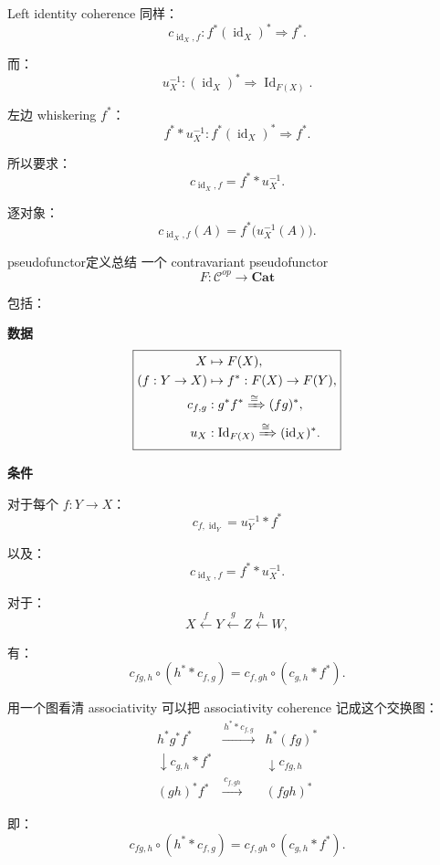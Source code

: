 \documentclass{beamer}
\begin{document}
\begin{frame}{Left identity coherence}
同样：
$$
c_{\operatorname{id}_X,f}
:
f^*(\operatorname{id}_X)^*
\Longrightarrow
f^*.
$$

而：
$$
u_X^{-1}:
(\operatorname{id}_X)^*
\Longrightarrow
\operatorname{Id}_{F(X)}.
$$

左边 whiskering \(f^*\)：
$$
f^**u_X^{-1}
:
f^*(\operatorname{id}_X)^*
\Longrightarrow
f^*.
$$

所以要求：
$$
\boxed{
c_{\operatorname{id}_X,f}
=
f^**u_X^{-1}.
}
$$

逐对象：
$$
\boxed{
c_{\operatorname{id}_X,f}(A)
=
f^*\bigl(u_X^{-1}(A)\bigr).
}
$$
\end{frame}

\begin{frame}{pseudofunctor定义总结}
一个 contravariant pseudofunctor
$$
\boxed{
F:\mathcal C^{op}\to\mathbf{Cat}
}
$$

包括：

\textbf{数据}
$$
\boxed{
\begin{aligned}
X&\mapsto F(X),\\
(f:Y\to X)&\mapsto f^*:F(X)\to F(Y),\\
c_{f,g}&:g^*f^*\xRightarrow{\cong}(fg)^*,\\
u_X&:\operatorname{Id}_{F(X)}
\xRightarrow{\cong}
(\operatorname{id}_X)^*.
\end{aligned}
}
$$

\textbf{条件}

对于每个 \(f:Y\to X\)：
$$
\boxed{
c_{f,\operatorname{id}_Y}
=
u_Y^{-1}*f^*
}
$$

以及：
$$
\boxed{
c_{\operatorname{id}_X,f}
=
f^**u_X^{-1}.
}
$$

对于：
$$
X\xleftarrow fY\xleftarrow gZ\xleftarrow hW,
$$

有：
$$
\boxed{
c_{fg,h}\circ(h^**c_{f,g})
=
c_{f,gh}\circ(c_{g,h}*f^*).
}
$$
\end{frame}

\begin{frame}[fragile]{用一个图看清 associativity}
可以把 associativity coherence 记成这个交换图：
$$
\boxed{
\begin{array}{ccc}
h^*g^*f^*
&
\xrightarrow{\,h^**c_{f,g}\,}
&
h^*(fg)^*
\\[2mm]
\downarrow{\scriptstyle c_{g,h}*f^*}
&&
\downarrow{\scriptstyle c_{fg,h}}
\\[2mm]
(gh)^*f^*
&
\xrightarrow{\,c_{f,gh}\,}
&
(fgh)^*
\end{array}
}
$$

即：
$$
\boxed{
c_{fg,h}\circ(h^**c_{f,g})
=
c_{f,gh}\circ(c_{g,h}*f^*).
}
$$
\end{frame}
\end{document}
